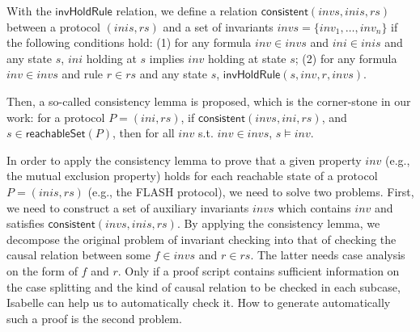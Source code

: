 \documentclass{llncs-new}
\begin{document}

With the $\mathsf{invHoldRule}$ relation, we define a   relation $\mathsf{consistent}( invs,inis, rs)$ between a protocol $(inis,rs)$ and a set of invariants $invs=\{inv_1,\ldots, inv_n\}$ if the following conditions hold: (1) for any formula $inv\in invs$ and $ini\in inis$ and any state $s$, $ini$ holding at
$s $ implies $inv$ holding at state $s $; (2)
  for any formula $inv\in invs$ and rule  $r \in rs$ and any state $s$,  $\mathsf{invHoldRule}(s, inv, r, invs   )$.

Then, a
so-called consistency lemma is proposed, which is the corner-stone in our work: %
 for a protocol $P=(ini,rs)$, if $\mathsf{consistent}( invs, ini, rs)$, and $s  \in \mathsf{reachableSet}(P)$, %
 then   for all $inv$ s.t. $inv \in invs$, $s \models inv $.



In order to  apply the consistency lemma to prove that a given property $inv$ (e.g., the mutual exclusion property) holds for each reachable state of a protocol $P=(inis,rs)$ (e.g., the FLASH  protocol), we need to solve two problems. First, we need to construct a set of auxiliary invariants $invs$ which contains $inv$ and satisfies  $\mathsf{consistent}( invs, inis, rs)$.  By applying the consistency lemma, we  decompose the original problem of invariant checking into that of checking the causal relation between some $f\in invs$ and $r \in rs$. The latter needs   case analysis on the form of $f$ and $r$.  Only if a proof script contains sufficient information on the case splitting and  the kind of causal relation to be checked in each subcase, Isabelle can help us to automatically  check it. How to  generate automatically such a proof is the second problem.
\end{document}
